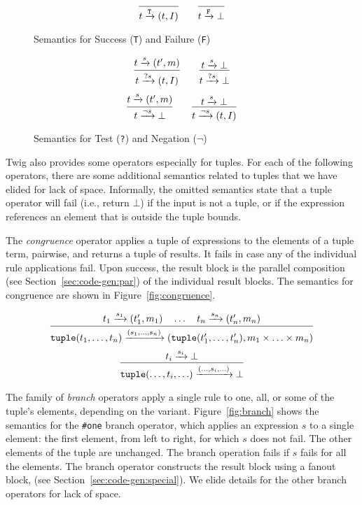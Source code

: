 \begin{figure}[ht]
\[
\infer
  {t \arr{\mathtt{T}} (t,I)}
  {}
\qquad
\infer
  {t \arr{\mathtt{F}} \bot}
  {}
\]
\caption{Semantics for Success (\texttt{T}) and Failure (\texttt{F})}
\label{fig:basic1}
\end{figure}

\begin{figure}[ht]
\[
\infer
  {t \arr{?s} (t,I)}
  {t \arr{s} (t',m)}
\qquad 
\infer
  {t \arr{?s} \bot}
  {t \arr{s} \bot}
\]
\[
\infer
  {t \arr{\lnot s} \bot}
  {t \arr{s} (t',m)}
\qquad 
\infer
  {t \arr{\lnot s} (t,I)}
  {t \arr{s} \bot}
\]
\caption{Semantics for Test (\texttt{?}) and Negation ($\lnot$)}
\label{fig:basic2}
\end{figure}

Twig also provides some operators especially for tuples. For each
of the following operators, there are some additional semantics
related to tuples that we have elided for lack of space.
Informally, the omitted semantics state that a tuple operator will
fail (i.e., return $\bot$) if the input is not a tuple, or if the
expression references an element that is outside the tuple bounds.


The \emph{congruence} operator applies a tuple of expressions to
the elements of a tuple term, pairwise, and returns a tuple of
results. It fails in case any of the individual rule applications
fail. Upon success, the result block is the parallel composition
(see Section~\ref{sec:code-gen:par}) of the individual result
blocks. The semantics for congruence are shown in
Figure~\ref{fig:congruence}.

\begin{figure*}[ht]
\[
\infer
  {\mathtt{tuple}(t_1,\ldots,t_n)\arr{(s_1,\ldots,s_n)} (\mathtt{tuple}(t_1',\ldots,t_n'),m_1 \times \ldots \times m_n)}
  {t_1 \arr{s_1} (t_1',m_1) \quad \ldots \quad t_n \arr{s_n} (t_n',m_n)}
\]
\[
\infer
  {\mathtt{tuple}(\ldots,t_i,\ldots)\arr{(\ldots,s_i,\ldots)}\bot}
  {t_i \arr{s_i} \bot}
\]
\caption{Semantics for congruence operator}
\label{fig:congruence}
\end{figure*}

The family of \emph{branch} operators apply a single rule to one,
all, or some of the tuple's elements, depending on the variant.
Figure~\ref{fig:branch} shows the semantics for the \texttt{\#one}
branch operator, which applies an expression $s$ to a single
element: the first element, from left to right, for which $s$ does
not fail. The other elements of the tuple are unchanged. The
branch operation fails if $s$ fails for all the elements. The
branch operator constructs the result block using a fanout block,
(see Section~\ref{sec:code-gen:special}). We elide details for the
other branch operators for lack of space.

